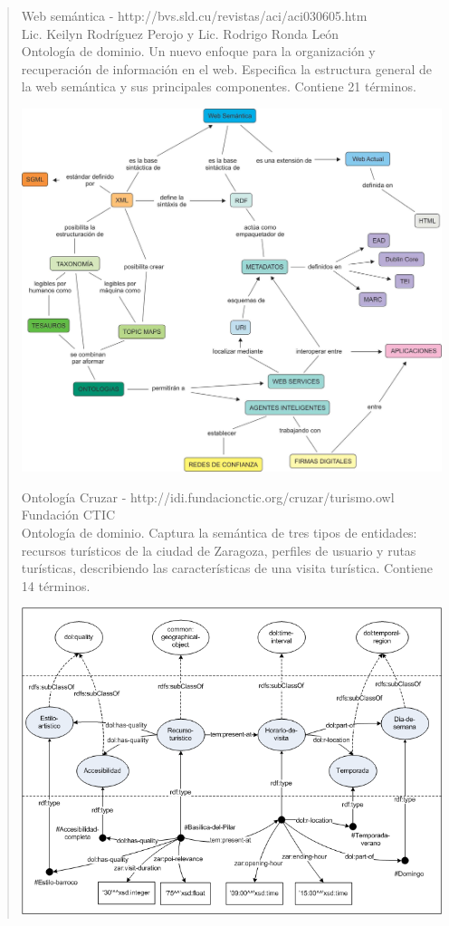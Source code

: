 \documentclass[a4paper,12pt,oneside,final,spanish]{article}
\begin{document}
\begin{quote}
Web semántica - http://bvs.sld.cu/revistas/aci/aci030605.htm\\
Lic. Keilyn Rodríguez Perojo y Lic. Rodrigo Ronda León\\
Ontología de dominio. Un nuevo enfoque para la organización y recuperación de información en el web. Especifica  la  estructura  general  de  la  web  semántica  y  sus principales componentes. Contiene 21 términos.

\begin{center}
\includegraphics[width=0.9\linewidth,keepaspectratio]{ont2.jpg}
\end{center}

Ontología Cruzar - http://idi.fundacionctic.org/cruzar/turismo.owl\\
Fundación CTIC\\
Ontología de dominio. Captura la semántica de tres tipos de entidades: recursos turísticos de la ciudad de Zaragoza, perfiles de usuario y rutas turísticas, describiendo las características de una visita turística. Contiene 14 términos.

\begin{center}
\includegraphics[width=0.9\linewidth,keepaspectratio]{ont3.png}
\end{center}


\end{quote}
\end{document}
